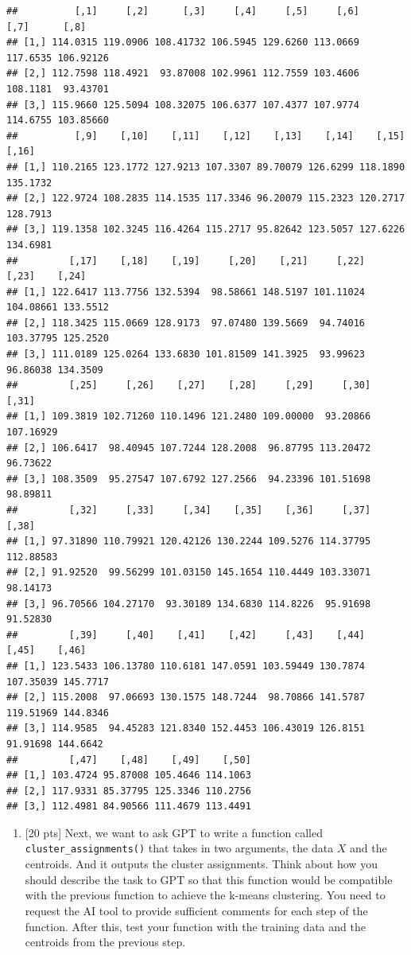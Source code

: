 \documentclass[
]{article}
\providecommand{\tightlist}{%
  \setlength{\itemsep}{0pt}\setlength{\parskip}{0pt}}
\begin{document}
\begin{verbatim}
##          [,1]     [,2]      [,3]     [,4]     [,5]     [,6]     [,7]      [,8]
## [1,] 114.0315 119.0906 108.41732 106.5945 129.6260 113.0669 117.6535 106.92126
## [2,] 112.7598 118.4921  93.87008 102.9961 112.7559 103.4606 108.1181  93.43701
## [3,] 115.9660 125.5094 108.32075 106.6377 107.4377 107.9774 114.6755 103.85660
##          [,9]    [,10]    [,11]    [,12]    [,13]    [,14]    [,15]    [,16]
## [1,] 110.2165 123.1772 127.9213 107.3307 89.70079 126.6299 118.1890 135.1732
## [2,] 122.9724 108.2835 114.1535 117.3346 96.20079 115.2323 120.2717 128.7913
## [3,] 119.1358 102.3245 116.4264 115.2717 95.82642 123.5057 127.6226 134.6981
##         [,17]    [,18]    [,19]     [,20]    [,21]     [,22]     [,23]    [,24]
## [1,] 122.6417 113.7756 132.5394  98.58661 148.5197 101.11024 104.08661 133.5512
## [2,] 118.3425 115.0669 128.9173  97.07480 139.5669  94.74016 103.37795 125.2520
## [3,] 111.0189 125.0264 133.6830 101.81509 141.3925  93.99623  96.86038 134.3509
##         [,25]     [,26]    [,27]    [,28]     [,29]     [,30]     [,31]
## [1,] 109.3819 102.71260 110.1496 121.2480 109.00000  93.20866 107.16929
## [2,] 106.6417  98.40945 107.7244 128.2008  96.87795 113.20472  96.73622
## [3,] 108.3509  95.27547 107.6792 127.2566  94.23396 101.51698  98.89811
##         [,32]     [,33]     [,34]    [,35]    [,36]     [,37]     [,38]
## [1,] 97.31890 110.79921 120.42126 130.2244 109.5276 114.37795 112.88583
## [2,] 91.92520  99.56299 101.03150 145.1654 110.4449 103.33071  98.14173
## [3,] 96.70566 104.27170  93.30189 134.6830 114.8226  95.91698  91.52830
##         [,39]     [,40]    [,41]    [,42]     [,43]    [,44]     [,45]    [,46]
## [1,] 123.5433 106.13780 110.6181 147.0591 103.59449 130.7874 107.35039 145.7717
## [2,] 115.2008  97.06693 130.1575 148.7244  98.70866 141.5787 119.51969 144.8346
## [3,] 114.9585  94.45283 121.8340 152.4453 106.43019 126.8151  91.91698 144.6642
##         [,47]    [,48]    [,49]    [,50]
## [1,] 103.4724 95.87008 105.4646 114.1063
## [2,] 117.9331 85.37795 125.3346 110.2756
## [3,] 112.4981 84.90566 111.4679 113.4491
\end{verbatim}

\bigskip

\begin{enumerate}
\def\labelenumi{\alph{enumi}.}
\setcounter{enumi}{1}
\tightlist
\item
  {[}20 pts{]} Next, we want to ask GPT to write a function called
  \texttt{cluster\_assignments()} that takes in two arguments, the data
  \(X\) and the centroids. And it outputs the cluster assignments. Think
  about how you should describe the task to GPT so that this function
  would be compatible with the previous function to achieve the k-means
  clustering. You need to request the AI tool to provide sufficient
  comments for each step of the function. After this, test your function
  with the training data and the centroids from the previous step.
\end{enumerate}
\end{document}
